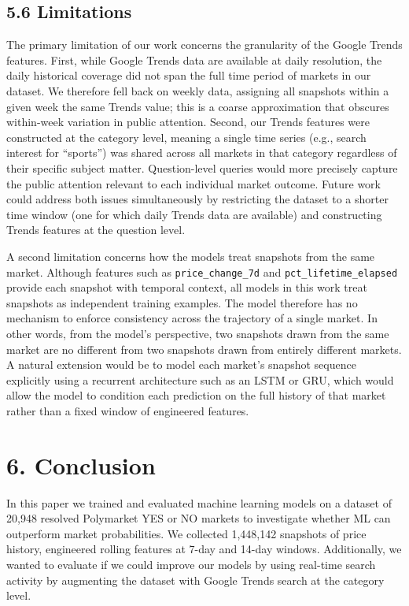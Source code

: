 \documentclass[11pt,twocolumn]{article}
\begin{document}
\subsection*{5.6 Limitations}
The primary limitation of our work concerns the granularity of the Google Trends features. First, while Google Trends data are available at daily resolution, the daily historical coverage did not span the full time period of markets in our dataset. We therefore fell back on weekly data, assigning all snapshots within a given week the same Trends value; this is a coarse approximation that obscures within-week variation in public attention. Second, our Trends features were constructed at the category level, meaning a single time series (e.g., search interest for ``sports'') was shared across all markets in that category regardless of their specific subject matter. Question-level queries would more precisely capture the public attention relevant to each individual market outcome. Future work could address both issues simultaneously by restricting the dataset to a shorter time window (one for which daily Trends data are available) and constructing Trends features at the question level.

A second limitation concerns how the models treat snapshots from the same market. Although features such as \texttt{price\_change\_7d} and \texttt{pct\_lifetime\_elapsed} provide each snapshot with temporal context, all models in this work treat snapshots as independent training examples. The model therefore has no mechanism to enforce consistency across the trajectory of a single market. In other words, from the model's perspective, two snapshots drawn from the same market are no different from two snapshots drawn from entirely different markets. A natural extension would be to model each market's snapshot sequence explicitly using a recurrent architecture such as an LSTM or GRU, which would allow the model to condition each prediction on the full history of that market rather than a fixed window of engineered features.

\section*{6. Conclusion}

In this paper we trained and evaluated machine learning models on a dataset of 20,948 resolved Polymarket YES or NO markets to investigate whether ML can outperform market probabilities. We collected 1,448,142 snapshots of price history, engineered rolling features at 7-day and 14-day windows. Additionally, we wanted to evaluate if we could improve our models by using real-time search activity by augmenting the dataset with Google Trends search at the category level.
\end{document}
